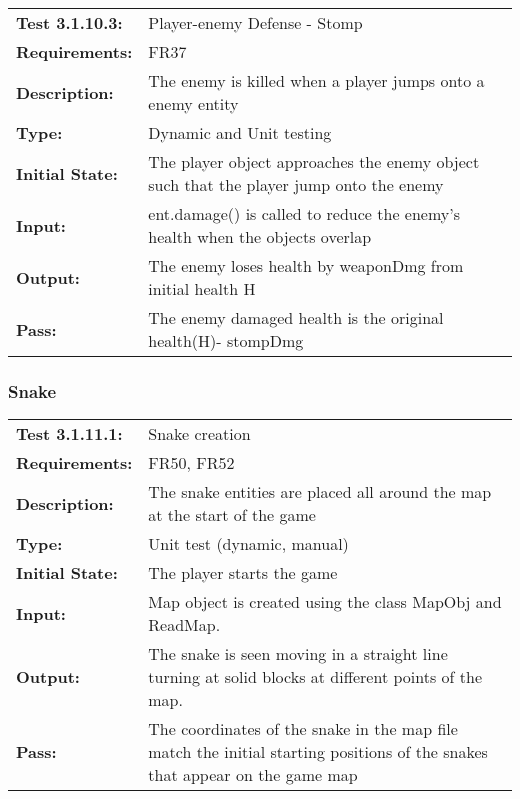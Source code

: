 \documentclass[12pt, titlepage]{article}
\begin{document}
\begin{tabular}{|l|p{10cm}|}
    \hline
    \bf{Test} 3.1.10.3: & Player-enemy Defense - Stomp \\
    \bf{Requirements}: & FR37\\
    \bf{Description}: & The enemy is killed when a player jumps onto a enemy entity\\
    \bf{Type}: & Dynamic and Unit testing\\
    \bf{Initial State}: & The player object approaches the enemy object such that the player jump onto the enemy \\
    \bf{Input}: & ent.damage() is called to reduce the enemy's health when the objects overlap\\
    \bf{Output}: & The enemy loses health by weaponDmg from initial health H \\
    \bf{Pass}: &  The enemy  damaged health is the original health(H)- stompDmg\\
    \hline
\end{tabular}

\subsubsection{Snake}

\begin{tabular}{|l|p{10cm}|}
    \hline
    \bf{Test} 3.1.11.1: & Snake creation\\
    \bf{Requirements}: & FR50, FR52\\
    \bf{Description}: & The snake entities are placed all around the map at the start of the game\\
    \bf{Type}:  &  Unit test (dynamic, manual)   \\
    \bf{Initial State}: & The player starts the game \\
    \bf{Input}: & Map object is created using the class MapObj and ReadMap. \\
    \bf{Output}: & The snake is seen moving in a straight line turning at solid blocks at different points of the map. \\
    \bf{Pass}: &  The coordinates of the snake in the map file match the initial starting positions of the snakes that appear on the game map\\
    \hline
\end{tabular}
\end{document}
